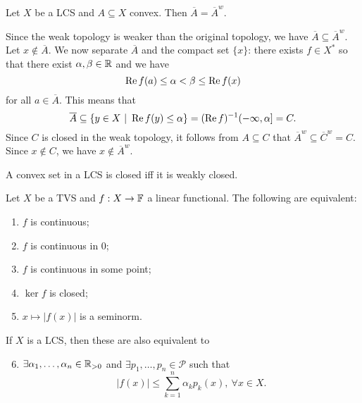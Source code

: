\begin{theorem}\label{thm:1.1}
  Let $X$ be a LCS and $A \subseteq X$ convex. Then $\overline{A} = \overline{A}^w$.
\end{theorem}

\begin{myproof}
  Since the weak topology is weaker than the original topology, we have $\overline{A} \subseteq \overline{A}^w$.
  Let $x \notin \overline{A}$.
  We now separate $\overline{A}$ and the compact set $\{x\}$: there exists $f \in X^*$
  so that there exist $\alpha, \beta \in \mathbb {R}$ and we have
  $$\operatorname{Re} f(a) \leq \alpha < \beta \leq \operatorname{Re} f(x)$$
  for all $a \in \overline{A}$.
  This means that 
  $$\overline{A} \subseteq \{y \in X\ |\ \operatorname{Re} f(y) \leq \alpha\} = (\operatorname{Re} f)^{-1} (-\infty, \alpha] = C.$$
  Since $C$ is closed in the weak topology, it follows from $A \subseteq C$ that $\overline{A}^w \subseteq \overline{C}^w = C.$ 
  Since $x \notin C$, we have $x \notin \overline{A}^w$.
\end{myproof}

\begin{corollary}
  A convex set in a LCS is closed iff it is weakly closed.
\end{corollary}

\begin{proposition}\label{prop:1.2}
  Let $X$ be a TVS and $f: X \to \mathbb {F}$ a linear functional. The following are equivalent:
  \begin{enumerate}
    \item $f$ is continuous;
    \item $f$ is continuous in $0$;
    \item $f$ is continuous in some point;
    \item $\ker f$ is closed;
    \item $x \mapsto |f(x)|$ is a seminorm.
  \end{enumerate}
  If $X$ is a LCS, then these are also equivalent to 
  \begin{enumerate}
    \setcounter{enumi}{5}
    \item $\exists \alpha_1, \dots, \alpha_n \in \mathbb {R}_{> 0}$ and $\exists p_1, \dots, p_n \in \mathcal{P}$ such that 
    $$|f(x)| \leq \sum_{k = 1} ^n \alpha_k p_k (x),\ \forall x \in X.$$
  \end{enumerate}
\end{proposition}

